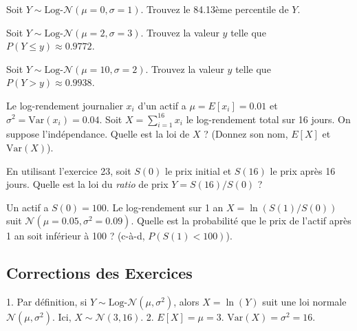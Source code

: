 \begin{exercicebox}
Soit $Y \sim \text{Log-}\mathcal{N}(\mu=0, \sigma=1)$. Trouvez le 84.13ème percentile de $Y$.
\end{exercicebox}

\begin{exercicebox}
Soit $Y \sim \text{Log-}\mathcal{N}(\mu=2, \sigma=3)$. Trouvez la valeur $y$ telle que $P(Y \le y) \approx 0.9772$.
\end{exercicebox}

\begin{exercicebox}
Soit $Y \sim \text{Log-}\mathcal{N}(\mu=10, \sigma=2)$. Trouvez la valeur $y$ telle que $P(Y > y) \approx 0.9938$.
\end{exercicebox}


\begin{exercicebox}
Le log-rendement journalier $x_i$ d'un actif a $\mu=E[x_i]=0.01$ et $\sigma^2=\text{Var}(x_i)=0.04$.
Soit $X = \sum_{i=1}^{16} x_i$ le log-rendement total sur 16 jours. On suppose l'indépendance.
Quelle est la loi de $X$ ? (Donnez son nom, $E[X]$ et $\text{Var}(X)$).
\end{exercicebox}

\begin{exercicebox}
En utilisant l'exercice 23, soit $S(0)$ le prix initial et $S(16)$ le prix après 16 jours.
Quelle est la loi du \textit{ratio} de prix $Y = S(16)/S(0)$ ?
\end{exercicebox}

\begin{exercicebox}
Un actif a $S(0)=100$. Le log-rendement sur 1 an $X = \ln(S(1)/S(0))$ suit $\mathcal{N}(\mu=0.05, \sigma^2=0.09)$.
Quelle est la probabilité que le prix de l'actif après 1 an soit inférieur à 100 ? (c-à-d, $P(S(1) < 100)$).
\end{exercicebox}

\subsection{Corrections des Exercices}

\begin{correctionbox}
1.  Par définition, si $Y \sim \text{Log-}\mathcal{N}(\mu, \sigma^2)$, alors $X = \ln(Y)$ suit une loi normale $\mathcal{N}(\mu, \sigma^2)$.
    Ici, $X \sim \mathcal{N}(3, 16)$.
2.  $E[X] = \mu = 3$.
    $\text{Var}(X) = \sigma^2 = 16$.
\end{correctionbox}

